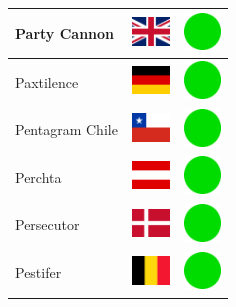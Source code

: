 \documentclass[12pt, a4paper, twoside]{report}
\begin{document}
\begin{center}
\begin{longtable}{|p{5cm}|p{2cm}|p{2cm}|}
 Party Cannon                                               & \includegraphics[width=1cm]{../4x3/gb} &   \includegraphics[width=1cm]{../likes/y} \\ \hline
 Paxtilence                                                 & \includegraphics[width=1cm]{../4x3/de} &   \includegraphics[width=1cm]{../likes/y} \\ \hline
 Pentagram Chile                                            & \includegraphics[width=1cm]{../4x3/cl} &   \includegraphics[width=1cm]{../likes/y} \\ \hline
 Perchta                                                    & \includegraphics[width=1cm]{../4x3/at} &   \includegraphics[width=1cm]{../likes/y} \\ \hline
 Persecutor                                                 & \includegraphics[width=1cm]{../4x3/dk} &   \includegraphics[width=1cm]{../likes/y} \\ \hline
 Pestifer                                                   & \includegraphics[width=1cm]{../4x3/be} &   \includegraphics[width=1cm]{../likes/y} \\ \hline

\end{longtable}
\end{center}
\end{document}
